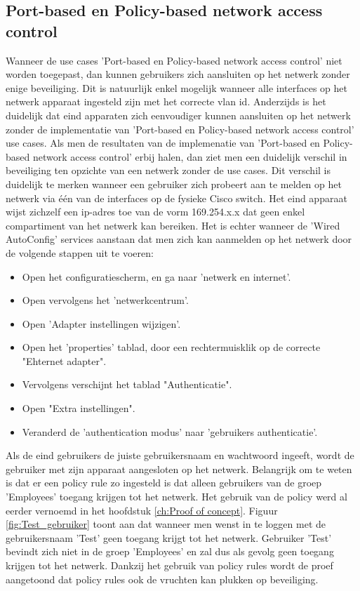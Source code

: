 \subsection{Port-based en Policy-based network access control}
Wanneer de use cases 'Port-based en Policy-based network access control' niet worden toegepast, dan kunnen gebruikers zich aansluiten op het netwerk zonder enige beveiliging. Dit is natuurlijk enkel mogelijk wanneer alle interfaces op het netwerk apparaat ingesteld zijn met het correcte vlan id. Anderzijds is het duidelijk dat eind apparaten zich eenvoudiger kunnen aansluiten op het netwerk zonder de implementatie van 'Port-based en Policy-based network access control' use cases.
Als men de resultaten van de implemenatie van 'Port-based en Policy-based network access control' erbij halen, dan ziet men een duidelijk verschil in beveiliging ten opzichte van een netwerk zonder de use cases. Dit verschil is duidelijk te merken wanneer een gebruiker zich probeert aan te melden op het netwerk via één van de interfaces op de fysieke Cisco switch. Het eind apparaat wijst zichzelf een ip-adres toe van de vorm 169.254.x.x dat geen enkel compartiment van het netwerk kan bereiken. 
\newline
\newline
Het is echter wanneer de 'Wired AutoConfig' services aanstaan dat men zich kan aanmelden op het netwerk door de volgende stappen uit te voeren: 
\begin{itemize}
	\item Open het configuratiescherm, en ga naar 'netwerk en internet'.
	\item Open vervolgens het 'netwerkcentrum'.
	\item Open 'Adapter instellingen wijzigen'.
	\item Open het 'properties' tablad, door een rechtermuisklik op de correcte "Ehternet adapter".
	\item Vervolgens verschijnt het tablad "Authenticatie".
	\item Open "Extra instellingen".
	\item Veranderd de 'authentication modus' naar 'gebruikers authenticatie'.
\end{itemize}

Als de eind gebruikers de juiste gebruikersnaam en wachtwoord ingeeft, wordt de gebruiker met zijn apparaat aangesloten op het netwerk. Belangrijk om te weten is dat er een policy rule zo ingesteld is dat alleen gebruikers van de groep 'Employees' toegang krijgen tot het netwerk. Het gebruik van de policy werd al eerder vernoemd in het hoofdstuk \ref{ch:Proof of concept}.
Figuur \ref{fig:Test_gebruiker} toont aan dat wanneer men wenst in te loggen met de gebruikersnaam 'Test' geen toegang krijgt tot het netwerk. Gebruiker 'Test' bevindt zich niet in de groep 'Employees' en zal dus als gevolg geen toegang krijgen tot het netwerk. Dankzij het gebruik van policy rules wordt de proef aangetoond dat policy rules ook de vruchten kan plukken op beveiliging.

